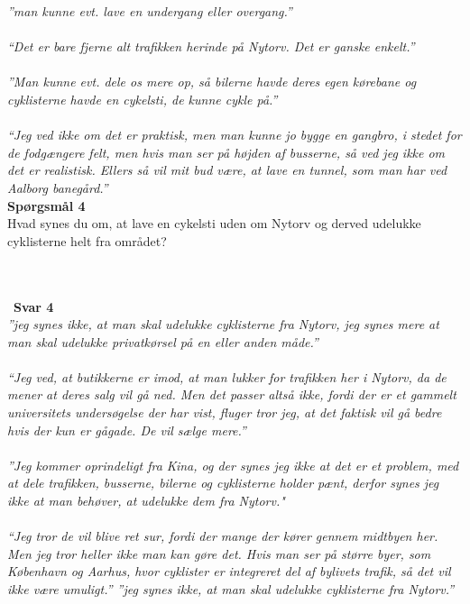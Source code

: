   \emph{”man kunne evt. lave en undergang eller overgang.”}
~\\\\
  \emph{“Det er bare fjerne alt trafikken herinde på Nytorv. Det er ganske enkelt.”}
~\\\\
  \emph{”Man kunne evt. dele os mere op, så bilerne havde deres egen kørebane og cyklisterne havde en cykelsti, de kunne cykle på.”}
~\\\\
  \emph{“Jeg ved ikke om det er praktisk, men man kunne jo bygge en gangbro, i stedet for de fodgængere felt, men hvis man ser på højden af busserne, så ved jeg ikke om det er realistisk. Ellers så vil mit bud være, at lave en tunnel, som man har ved Aalborg banegård.”}
~\\
\textbf{Spørgsmål 4}
~\\
Hvad synes du om, at lave en cykelsti uden om Nytorv og derved udelukke cyklisterne helt fra området?

~\\\\
~\textbf{Svar 4} ~\\
\emph{”jeg synes ikke, at man skal udelukke cyklisterne fra Nytorv, jeg synes mere at man skal udelukke privatkørsel på en eller anden måde.”}
~\\\\
  \emph{“Jeg ved, at butikkerne er imod, at man lukker for trafikken her i Nytorv, da de mener at deres salg vil gå ned. Men det passer altså ikke, fordi der er et gammelt universitets undersøgelse der har vist, fluger tror jeg, at det faktisk vil gå bedre hvis der kun er gågade. De vil sælge mere.”}
~\\\\
\emph{”Jeg kommer oprindeligt fra Kina, og der synes jeg ikke at det er et problem, med at dele trafikken, busserne, bilerne og cyklisterne holder pænt, derfor synes jeg ikke at man behøver, at udelukke dem fra Nytorv."}
~\\\\
\emph{ “Jeg tror de vil blive ret sur, fordi der mange der kører gennem midtbyen her. Men jeg tror heller ikke man kan gøre det. Hvis man ser på større byer, som København og Aarhus, hvor cyklister er integreret del af bylivets trafik, så det vil ikke være umuligt.”
  ”jeg synes ikke, at man skal udelukke cyklisterne fra Nytorv.”}
~\\\\


